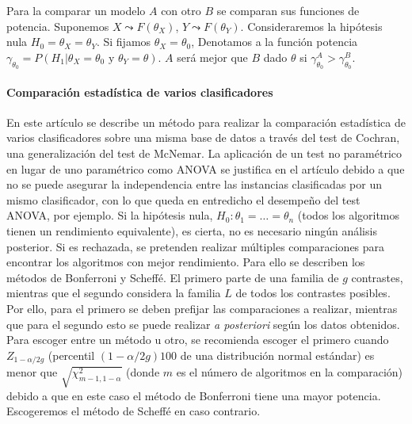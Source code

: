 	Para la comparar un modelo $A$ con otro $B$ se comparan sus funciones de potencia. Suponemos $X \leadsto F(\theta_X)$, $Y \leadsto F(\theta_Y)$. Consideraremos la hipótesis nula $H_0 = \theta_X = \theta_Y$. Si fijamos $\theta_X= \theta_0$, Denotamos a la función potencia $\gamma_{\theta_0}= P(H_1 | \theta_X = \theta_0 \text{ y } \theta_Y = \theta)$. $A$ será mejor que $B$ dado $\theta$ si $\gamma_{\theta_0}^A  >\gamma_{\theta_0}^B$.
	
\paragraph{Comparación estadística de varios clasificadores} \cite{CHENGCHEN03} En este artículo se describe un método para realizar la comparación estadística de varios clasificadores sobre una misma base de datos a través del test de Cochran, una generalización del test de McNemar. La aplicación de un test no paramétrico en lugar de uno paramétrico como ANOVA se justifica en el artículo debido a que no se puede asegurar la independencia entre las instancias clasificadas por un mismo clasificador, con lo que queda en entredicho el desempeño del test ANOVA, por ejemplo. Si la hipótesis nula, $H_0: \theta_1 = \dots = \theta_n$ (todos los algoritmos tienen un rendimiento equivalente), es cierta, no es necesario ningún análisis posterior. Si es rechazada, se pretenden realizar múltiples comparaciones para encontrar los algoritmos con mejor rendimiento. Para ello se describen los métodos de Bonferroni y Scheffé. El primero parte de una familia de $g$ contrastes, mientras que el segundo considera la familia $L$ de todos los contrastes posibles. Por ello, para el primero se deben prefijar las comparaciones a realizar, mientras que para el segundo esto se puede realizar \textit{a posteriori} según los datos obtenidos. Para escoger entre un método u otro, se recomienda escoger el primero cuando $Z_{1-\alpha/2g}$ (percentil $(1-\alpha/2g)100$ de una distribución normal estándar) es menor que $\sqrt{\chi^2_{m-1,1-\alpha}}$ (donde $m$ es el número de algoritmos en la comparación) debido a que en este caso el método de Bonferroni tiene una mayor potencia. Escogeremos el método de Scheffé en caso contrario.

